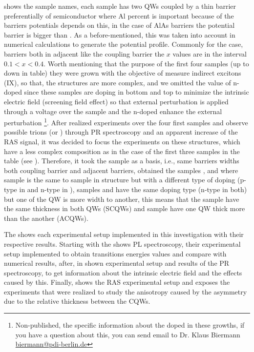  shows the sample names, each sample has two QWs coupled by a thin barrier preferentially of \algaas semiconductor where Al percent is important because of the barriers potentials depends on this, in the case of AlAs barriers the potential barrier is bigger than \algaas. As a before-mentioned, this was taken into account in numerical calculations to generate the potential profile. Commonly for the case, \algaas barriers both in adjacent like the coupling barrier the $x$ values are in the interval $0.1<x<0.4$. Worth mentioning that the purpose of the first four samples (up to down in table) they were grown with the objective of measure indirect excitons (IX), so that,  the structures are more complex, and we omitted the value of n-doped since these samples are doping in bottom and top to minimize the intrinsic electric field (screening field effect) so that external perturbation is applied through a voltage over the sample\cite{yuan2018tunneling} and the n-doped enhance the external perturbation \footnote{Non-published, the specific information about the doped  in these growths, if you have a question about this, you can send email to Dr. Klaus Biermann \url{biermann@pdi-berlin.de}}. After realized experiments over the four first samples and observe possible trions  (\xp or \xm)  through PR spectroscopy and an apparent increase of the RAS signal, it was decided to focus the experiments on these structures, which have a less complex composition as in the case of the first three samples in the table (see ). Therefore,  it took the sample \tucu as a  basis, i.e., same barriers widths both coupling barrier and adjacent barriers, obtained the samples \tcvu, \tcvd and \tcvt where sample \tcvd is the same to sample \tcvu in structure but with a different type of doping (p-type in \tcvd and n-type in \tcvu), samples \tcvu and \tcvd have the same doping type (n-type in both) but one of the QW is more width to another, this means that the sample \tcvt have the same thickness in both QWs (SCQWs) and sample \tcvu have one  QW  thick more than the another (ACQWs). 

The   shows each experimental setup implemented in this investigation with their respective results. Starting with the   shows PL spectroscopy, their experimental setup implemented to obtain transitions energies values and compare with numerical results, after,  in  shown experimental setup and results of the PR spectroscopy, to get information about the intrinsic electric field and the effects caused by this. Finally,   shows the RAS experimental setup and exposes the experiments that were realized to study the anisotropy caused by the asymmetry due to the relative thickness between the CQWs.

